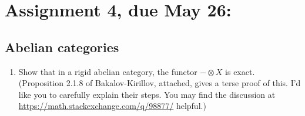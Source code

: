 \documentclass[12pt]{amsart}
\begin{document}
\newpage
\section{Assignment 4, due May 26:}
\subsection{Abelian categories}
\begin{enumerate}
\item Show that in a rigid abelian category, the functor $- \otimes X$ is exact. (Proposition 2.1.8 of Bakalov-Kirillov, attached,
gives a terse proof of this. I'd like you to carefully explain their steps. You may find the discussion at \url{https://math.stackexchange.com/q/98877/} helpful.)
\end{enumerate}
\end{document}
